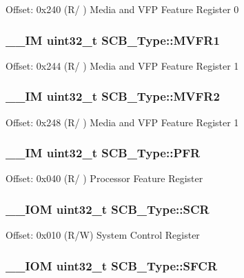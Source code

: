 Offset\-: 0x240 (R/ ) Media and V\-F\-P Feature Register 0 \hypertarget{struct_s_c_b___type_a75d6299150fdcbbcb765e22ff27c432e}{
\subsubsection[{M\-V\-F\-R1}]{\setlength{\rightskip}{0pt plus 5cm}\-\_\-\-\_\-\-I\-M uint32\-\_\-t S\-C\-B\-\_\-\-Type\-::\-M\-V\-F\-R1}}\label{struct_s_c_b___type_a75d6299150fdcbbcb765e22ff27c432e}
Offset\-: 0x244 (R/ ) Media and V\-F\-P Feature Register 1 \hypertarget{struct_s_c_b___type_a280ef961518ecee3ed43a86404853c3d}{
\subsubsection[{M\-V\-F\-R2}]{\setlength{\rightskip}{0pt plus 5cm}\-\_\-\-\_\-\-I\-M uint32\-\_\-t S\-C\-B\-\_\-\-Type\-::\-M\-V\-F\-R2}}\label{struct_s_c_b___type_a280ef961518ecee3ed43a86404853c3d}
Offset\-: 0x248 (R/ ) Media and V\-F\-P Feature Register 1 \hypertarget{struct_s_c_b___type_a40745bb0af880c45827a653222d54117}{
\subsubsection[{P\-F\-R}]{\setlength{\rightskip}{0pt plus 5cm}\-\_\-\-\_\-\-I\-M uint32\-\_\-t S\-C\-B\-\_\-\-Type\-::\-P\-F\-R}}\label{struct_s_c_b___type_a40745bb0af880c45827a653222d54117}
Offset\-: 0x040 (R/ ) Processor Feature Register \hypertarget{struct_s_c_b___type_a3a4840c6fa4d1ee75544f4032c88ec34}{
\subsubsection[{S\-C\-R}]{\setlength{\rightskip}{0pt plus 5cm}\-\_\-\-\_\-\-I\-O\-M uint32\-\_\-t S\-C\-B\-\_\-\-Type\-::\-S\-C\-R}}\label{struct_s_c_b___type_a3a4840c6fa4d1ee75544f4032c88ec34}
Offset\-: 0x010 (R/\-W) System Control Register \hypertarget{struct_s_c_b___type_a82273352d2e8c7a28a7b7cbdfc3d6a75}{
\subsubsection[{S\-F\-C\-R}]{\setlength{\rightskip}{0pt plus 5cm}\-\_\-\-\_\-\-I\-O\-M uint32\-\_\-t S\-C\-B\-\_\-\-Type\-::\-S\-F\-C\-R}}\label{struct_s_c_b___type_a82273352d2e8c7a28a7b7cbdfc3d6a75}
